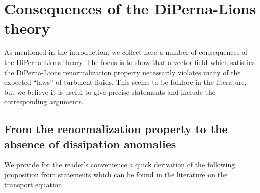 \documentclass[11pt,reqno]{amsart}
\theoremstyle{definition}
\numberwithin{equation}{section}
\begin{document}
\section{Consequences of the DiPerna-Lions theory}

As mentioned in the introduction, we collect here a number of consequences of the DiPerna-Lions theory. The focus is to show that a vector field which satisties the DiPerna-Lions renormalization property necessarily violates many of the expected ``laws'' of turbulent fluids. This seems to be folklore in the literature, but we believe it is useful to give precise statements and include the corresponding arguments. 

\subsection{From the renormalization property to the absence of dissipation anomalies}\label{s:no-dissipation}
We provide for the reader's convenience a quick derivation of the following proposition from statements which can be found in the literature on the transport equation. 
\end{document}
